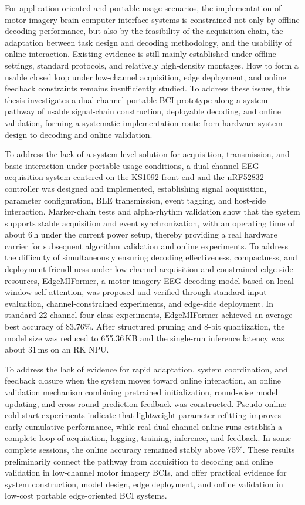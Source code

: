 \begin{eabstract}
For application-oriented and portable usage scenarios, the implementation of motor imagery brain-computer interface systems is constrained not only by offline decoding performance, but also by the feasibility of the acquisition chain, the adaptation between task design and decoding methodology, and the usability of online interaction. Existing evidence is still mainly established under offline settings, standard protocols, and relatively high-density montages. How to form a usable closed loop under low-channel acquisition, edge deployment, and online feedback constraints remains insufficiently studied. To address these issues, this thesis investigates a dual-channel portable BCI prototype along a system pathway of usable signal-chain construction, deployable decoding, and online validation, forming a systematic implementation route from hardware system design to decoding and online validation.

To address the lack of a system-level solution for acquisition, transmission, and basic interaction under portable usage conditions, a dual-channel EEG acquisition system centered on the KS1092 front-end and the nRF52832 controller was designed and implemented, establishing signal acquisition, parameter configuration, BLE transmission, event tagging, and host-side interaction. Marker-chain tests and alpha-rhythm validation show that the system supports stable acquisition and event synchronization, with an operating time of about 6\,h under the current power setup, thereby providing a real hardware carrier for subsequent algorithm validation and online experiments. To address the difficulty of simultaneously ensuring decoding effectiveness, compactness, and deployment friendliness under low-channel acquisition and constrained edge-side resources, EdgeMIFormer, a motor imagery EEG decoding model based on local-window self-attention, was proposed and verified through standard-input evaluation, channel-constrained experiments, and edge-side deployment. In standard 22-channel four-class experiments, EdgeMIFormer achieved an average best accuracy of 83.76\%. After structured pruning and 8-bit quantization, the model size was reduced to 655.36\,KB and the single-run inference latency was about 31\,ms on an RK NPU.

To address the lack of evidence for rapid adaptation, system coordination, and feedback closure when the system moves toward online interaction, an online validation mechanism combining pretrained initialization, round-wise model updating, and cross-round prediction feedback was constructed. Pseudo-online cold-start experiments indicate that lightweight parameter refitting improves early cumulative performance, while real dual-channel online runs establish a complete loop of acquisition, logging, training, inference, and feedback. In some complete sessions, the online accuracy remained stably above 75\%. These results preliminarily connect the pathway from acquisition to decoding and online validation in low-channel motor imagery BCIs, and offer practical evidence for system construction, model design, edge deployment, and online validation in low-cost portable edge-oriented BCI systems.

\end{eabstract}

